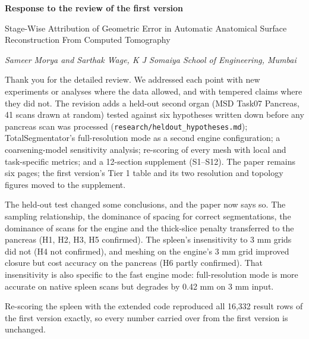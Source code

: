 \documentclass[11pt]{article}
\begin{document}
{\Large\bfseries Response to the review of the first version\par}\medskip
Stage-Wise Attribution of Geometric Error in Automatic Anatomical Surface Reconstruction From Computed Tomography\par
\textit{Sameer Morya and Sarthak Wage, K J Somaiya School of Engineering, Mumbai}\par\medskip
Thank you for the detailed review. We addressed each point with new experiments or analyses where the data allowed, and with tempered claims where they did not. The revision adds a held-out second organ (MSD Task07 Pancreas, 41 scans drawn at random) tested against six hypotheses written down before any pancreas scan was processed (\texttt{research/heldout\_hypotheses.md}); TotalSegmentator's full-resolution mode as a second engine configuration; a coarsening-model sensitivity analysis; re-scoring of every mesh with local and task-specific metrics; and a 12-section supplement (S1–S12). The paper remains six pages; the first version's Tier 1 table and its two resolution and topology figures moved to the supplement.\par
The held-out test changed some conclusions, and the paper now says so. The sampling relationship, the dominance of spacing for correct segmentations, the dominance of scans for the engine and the thick-slice penalty transferred to the pancreas (H1, H2, H3, H5 confirmed). The spleen's insensitivity to 3 mm grids did not (H4 not confirmed), and meshing on the engine's 3 mm grid improved closure but cost accuracy on the pancreas (H6 partly confirmed). That insensitivity is also specific to the fast engine mode: full-resolution mode is more accurate on native spleen scans but degrades by 0.42 mm on 3 mm input.\par
Re-scoring the spleen with the extended code reproduced all 16,332 result rows of the first version exactly, so every number carried over from the first version is unchanged.\par
\end{document}
